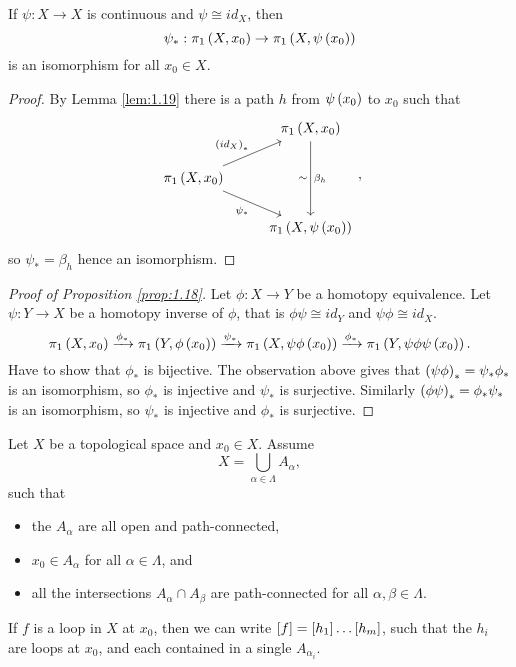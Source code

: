 \begin{corollary}
If $ \psi : X \to X $ is continuous and $ \psi \cong id_X $, then
$$ \psi_* : \pi_1\rb{X, x_0} \to \pi_1\rb{X, \psi\rb{x_0}} $$
is an isomorphism for all $ x_0 \in X $.
\end{corollary}

\begin{proof}
By Lemma \ref{lem:1.19} there is a path $ h $ from $ \psi\rb{x_0} $ to $ x_0 $ such that
$$
\begin{tikzcd}
& \pi_1\rb{X, x_0} \arrow{dd}{\beta_h}[swap]{\sim} \\
\pi_1\rb{X, x_0} \arrow{ur}{\rb{id_X}_*} \arrow[swap]{dr}{\psi_*} & \\
& \pi_1\rb{X, \psi\rb{x_0}}
\end{tikzcd},
$$
so $ \psi_* = \beta_h $ hence an isomorphism.
\end{proof}

\begin{proof}[Proof of Proposition \ref{prop:1.18}]
Let $ \phi : X \to Y $ be a homotopy equivalence. Let $ \psi : Y \to X $ be a homotopy inverse of $ \phi $, that is $ \phi\psi \cong id_Y $ and $ \psi\phi \cong id_X $.
$$ \pi_1\rb{X, x_0} \xrightarrow{\phi_*} \pi_1\rb{Y, \phi\rb{x_0}} \xrightarrow{\psi_*} \pi_1\rb{X, \psi\phi\rb{x_0}} \xrightarrow{\phi_*} \pi_1\rb{Y, \psi\phi\psi\rb{x_0}}. $$
Have to show that $ \phi_* $ is bijective. The observation above gives that $ \rb{\psi\phi}_* = \psi_*\phi_* $ is an isomorphism, so $ \phi_* $ is injective and $ \psi_* $ is surjective. Similarly $ \rb{\phi\psi}_* = \phi_*\psi_* $ is an isomorphism, so $ \psi_* $ is injective and $ \phi_* $ is surjective.
\end{proof}

\begin{lemma}
\label{lem:1.15}
Let $ X $ be a topological space and $ x_0 \in X $. Assume
$$ X = \bigcup_{\alpha \in \Lambda} A_\alpha, $$
such that
\begin{itemize}
\item the $ A_\alpha $ are all open and path-connected,
\item $ x_0 \in A_\alpha $ for all $ \alpha \in \Lambda $, and
\item all the intersections $ A_\alpha \cap A_\beta $ are path-connected for all $ \alpha, \beta \in \Lambda $.
\end{itemize}
If $ f $ is a loop in $ X $ at $ x_0 $, then we can write $ \sb{f} = \sb{h_1} \dots \sb{h_m} $, such that the $ h_i $ are loops at $ x_0 $, and each contained in a single $ A_{\alpha_i} $.
\end{lemma}

